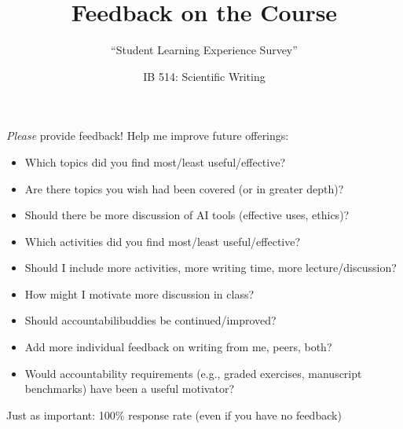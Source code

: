 \documentclass{beamer}
\title{Feedback on the Course}
\subtitle{``Student Learning Experience Survey''}
\author[]{IB 514: Scientific Writing}
\date[]{}
\begin{document}
\begin{frame}
  \titlepage
\end{frame}


\begin{frame}{\textit{Please} provide feedback!}
  \footnotesize
  \alert{Help me improve future offerings:}
  \begin{itemize}
    \item Which topics did you find most/least useful/effective?
    \item Are there topics you wish had been covered (or in greater depth)?
    \item Should there be more discussion of AI tools (effective uses, ethics)?
    \item Which activities did you find most/least useful/effective?
    \item Should I include more activities, more writing time, more lecture/discussion?
    \item How might I motivate more discussion in class?
    \item Should accountabilibuddies be continued/improved?
    \item Add more individual feedback on  writing from me, peers, both?
    \item Would accountability requirements (e.g., graded exercises, manuscript benchmarks) have been a useful motivator?
  \end{itemize}


  \alert{Just as important}: 100\% response rate (even if you have no feedback) 
\end{frame}
\end{document}
